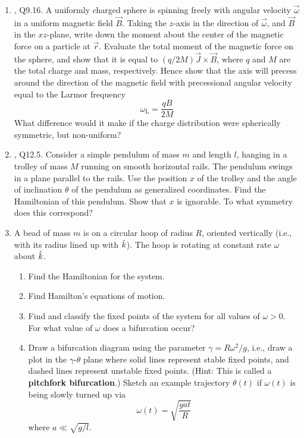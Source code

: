 \documentclass[../psets.tex]{subfiles}
\begin{document}
\begin{enumerate}
\begin{enumerate}
    \end{enumerate}
    \item \textcite{bib:KibbleBerkshire}, Q9.16. A uniformly charged sphere is spinning freely with angular velocity $\vec{\omega}$ in a uniform magnetic field $\vec{B}$. Taking the $z$-axis in the direction of $\vec{\omega}$, and $\vec{B}$ in the $xz$-plane, write down the moment about the center of the magnetic force on a particle at $\vec{r}$. Evaluate the total moment of the magnetic force on the sphere, and show that it is equal to $(q/2M)\vec{J}\times\vec{B}$, where $q$ and $M$ are the total charge and mass, respectively. Hence show that the axis will precess around the direction of the magnetic field with precessional angular velocity equal to the Larmor frequency
    \begin{equation*}
        \omega_\text{L} = \frac{qB}{2M}
    \end{equation*}
    What difference would it make if the charge distribution were spherically symmetric, but non-uniform?
    \item \textcite{bib:KibbleBerkshire}, Q12.5. Consider a simple pendulum of mass $m$ and length $l$, hanging in a trolley of mass $M$ running on smooth horizontal rails. The pendulum swings in a plane parallel to the rails. Use the position $x$ of the trolley and the angle of inclination $\theta$ of the pendulum as generalized coordinates. Find the Hamiltonian of this pendulum. Show that $x$ is ignorable. To what symmetry does this correspond?
    \item A bead of mass $m$ is on a circular hoop of radius $R$, oriented vertically (i.e., with its radius lined up with $\hat{k}$). The hoop is rotating at constant rate $\omega$ about $\hat{k}$.
    \begin{enumerate}
        \item Find the Hamiltonian for the system.
        \item Find Hamilton's equations of motion.
        \item Find and classify the fixed points of the system for all values of $\omega>0$. For what value of $\omega$ does a bifurcation occur?
        \item Draw a bifurcation diagram using the parameter $\gamma=R\omega^2/g$, i.e., draw a plot in the $\gamma$-$\theta$ plane where solid lines represent stable fixed points, and dashed lines represent unstable fixed points. (Hint: This is called a \textbf{pitchfork bifurcation}.) Sketch an example trajectory $\theta(t)$ if $\omega(t)$ is being slowly turned up via
        \begin{equation*}
            \omega(t) = \sqrt{\frac{gat}{R}}
        \end{equation*}
        where $a\ll\sqrt{g/l}$.
    \end{enumerate}
\end{enumerate}
\end{document}

